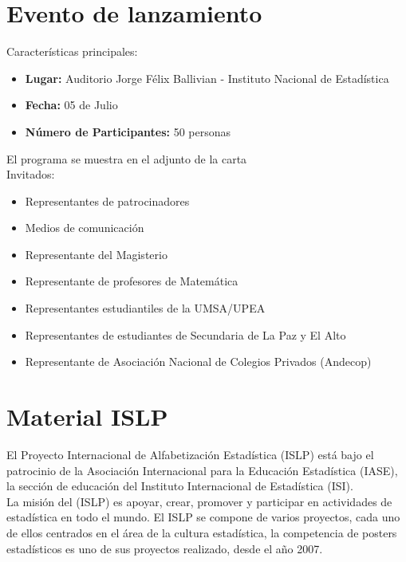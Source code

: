\documentclass{article}
\begin{document}
\appendix

\section{Evento de lanzamiento}


Características principales:

\begin{itemize}
\item \textbf{Lugar:} Auditorio Jorge Félix Ballivian -  Instituto Nacional de Estadística
\item \textbf{Fecha:} 05 de Julio
\item \textbf{Número de Participantes:} 50 personas
\label{prog}
\end{itemize}


El programa se muestra en el adjunto de la carta\\

Invitados:

\begin{itemize}
\item Representantes de patrocinadores 
\item Medios de comunicación
\item Representante del Magisterio
\item Representante de profesores de Matemática
\item Representantes estudiantiles de la UMSA/UPEA
\item Representantes de estudiantes de Secundaria de La Paz y El Alto
\item Representante de Asociación Nacional de Colegios Privados (Andecop)
\end{itemize}




\section{Material ISLP}

El Proyecto Internacional de Alfabetización Estadística (ISLP) está bajo el patrocinio
de la Asociación Internacional para la Educación Estadística (IASE), la sección
de educación del Instituto Internacional de Estadística (ISI).\\

 La misión del (ISLP) es
apoyar, crear, promover y participar en actividades de estadística en todo el mundo. El
ISLP se compone de varios proyectos, cada uno de ellos centrados en el área de la cultura
estadística, la competencia de posters estadísticos es uno de sus proyectos realizado, desde el año 2007.\\
\end{document}
